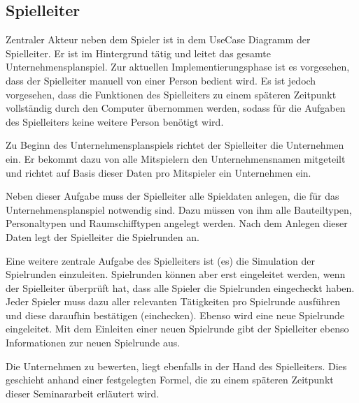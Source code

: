 \subsection{Spielleiter}
\label{sec:fachkonzept-usecase-spielleiter}

Zentraler Akteur neben dem Spieler ist in dem UseCase Diagramm der Spielleiter. Er ist im Hintergrund tätig und leitet das gesamte Unternehmensplanspiel. Zur aktuellen Implementierungsphase ist es vorgesehen, dass der Spielleiter manuell von einer Person bedient wird. Es ist jedoch vorgesehen, dass die Funktionen des Spielleiters zu einem späteren Zeitpunkt vollständig durch den Computer übernommen werden, sodass für die Aufgaben des Spielleiters keine weitere Person benötigt wird.
 
Zu Beginn des Unternehmensplanspiels richtet der Spielleiter die Unternehmen ein. Er bekommt dazu von alle Mitspielern den Unternehmensnamen mitgeteilt und richtet auf Basis dieser Daten pro Mitspieler ein Unternehmen ein.
 
Neben dieser Aufgabe muss der Spielleiter alle Spieldaten anlegen, die für das Unternehmensplanspiel notwendig sind. Dazu müssen von ihm alle Bauteiltypen, Personaltypen und Raumschifftypen angelegt werden. Nach dem Anlegen dieser Daten legt der Spielleiter die Spielrunden an.
 
Eine weitere zentrale Aufgabe des Spielleiters ist (es) die Simulation der Spielrunden einzuleiten. Spielrunden können aber erst eingeleitet werden, wenn der Spielleiter überprüft hat, dass alle Spieler die Spielrunden eingecheckt haben. Jeder Spieler muss dazu aller relevanten Tätigkeiten pro Spielrunde ausführen und diese daraufhin bestätigen (einchecken). Ebenso wird eine neue Spielrunde eingeleitet.  Mit dem Einleiten einer neuen Spielrunde gibt der Spielleiter ebenso Informationen zur neuen Spielrunde aus.
 
Die Unternehmen zu bewerten, liegt ebenfalls in der Hand des Spielleiters. Dies geschieht anhand einer festgelegten Formel, die zu einem späteren Zeitpunkt dieser Seminararbeit erläutert wird.